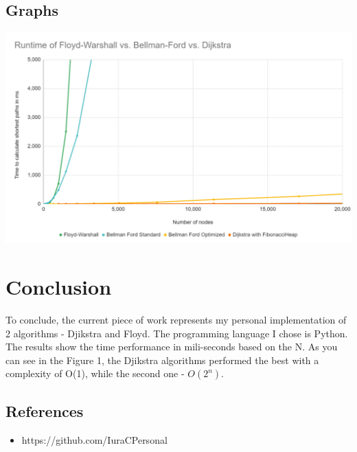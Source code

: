 \documentclass[a4paper, 12pt]{article}
\begin{document}
\subsection{Graphs}

\includegraphics[width=14cm]{img1.png}

\section{Conclusion}

To conclude, the current piece of work represents my personal implementation of 2 algorithms - Djikstra and Floyd. The programming
language I chose is Python. The results show the time performance in mili-seconds
based on the N. As you can see in the Figure 1, the Djikstra algorithms
performed the best with a complexity of O(1), while the second one - $O(2^n)$.

\subsection{References}

\begin{itemize}
      \item https://github.com/IuraCPersonal
\end{itemize}
\end{document}

